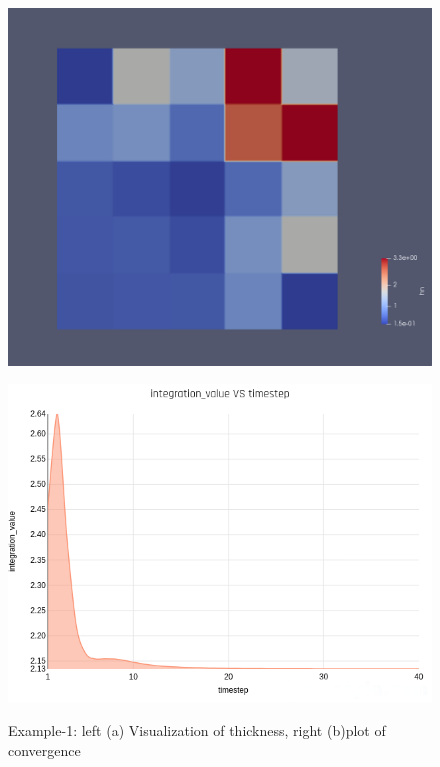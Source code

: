 \documentclass[paper=a4, fontsize=11pt]{scrartcl}
\numberwithin{equation}{section}		%
\numberwithin{figure}{section}			%
\numberwithin{table}{section}				%
\begin{document}
\begin{figure}
\centering
\begin{minipage}{.5\textwidth}
  \centering
  \includegraphics[width=.8\linewidth]{F1.png}
 
  \label{fig:test1}
\end{minipage}%
\begin{minipage}{.5\textwidth}
  \centering
  \includegraphics[width=.8\linewidth]{chartF1.png}
  
  \label{fig:test2}
\end{minipage}
\caption{Example-1: left (a) Visualization of thickness, right (b)plot of convergence }
\end{figure}
\end{document}
